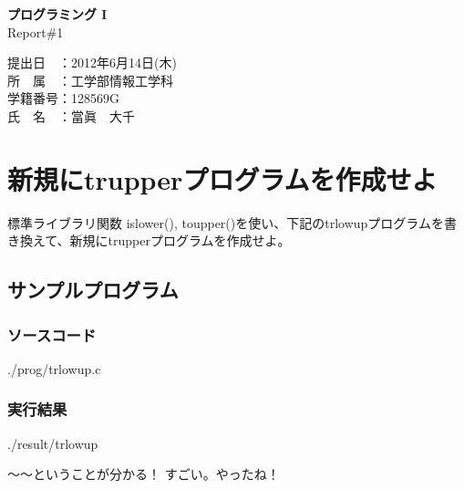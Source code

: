 \documentclass[10pt]{jarticle}
\begin{document}
\begin{titlepage}
\begin{center}
\vspace*{200truept}
{\Huge\bf プログラミング I}\\ %
\vspace*{10truept}
\hspace*{200truept}
{\Large Report\#1}\\ %
\vspace*{320truept}
\end{center}
\begin{flushleft}
{\Large
  \hspace*{300truept}
  提出日　：2012年6月14日(木)\\
  \hspace*{300truept}
  所　属　：工学部情報工学科\\
  \hspace*{300truept}
  学籍番号：128569G\\
  \hspace*{300truept}
  氏　名　：當眞　大千\\
}
\end{flushleft}
\end{titlepage}

\tableofcontents
\newpage
{}
\section{新規にtrupperプログラムを作成せよ}
標準ライブラリ関数 islower(), toupper()を使い、下記のtrlowupプログラムを書き換えて、新規にtrupperプログラムを作成せよ。
\subsection{サンプルプログラム}
\subsubsection{ソースコード}

{./prog/trlowup.c}

\subsubsection{実行結果}

{./result/trlowup}

〜〜ということが分かる！
すごい。やったね！\\
\end{document}
